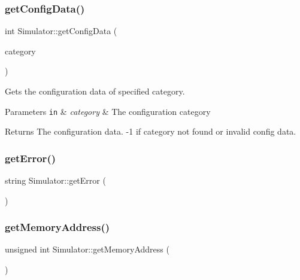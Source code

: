 \subsubsection{\texorpdfstring{get\+Config\+Data()}{getConfigData()}}
{\footnotesize\ttfamily int Simulator\+::get\+Config\+Data (\begin{DoxyParamCaption}\item[{\hyperlink{_sim_data_structs_8h_a32f23b552ade08d96d49cc3061a27165}{Config\+Category}}]{category }\end{DoxyParamCaption})\hspace{0.3cm}{\ttfamily [private]}}



Gets the configuration data of specified category. 


\begin{DoxyParams}[1]{Parameters}
\mbox{\tt in}  & {\em category} & The configuration category\\
\hline
\end{DoxyParams}
\begin{DoxyReturn}{Returns}
The configuration data. -\/1 if category not found or invalid config data. 
\end{DoxyReturn}
\hypertarget{class_simulator_a18d712f028a9b09f131b48a0ca79c056}{}\label{class_simulator_a18d712f028a9b09f131b48a0ca79c056} 
\subsubsection{\texorpdfstring{get\+Error()}{getError()}}
{\footnotesize\ttfamily string Simulator\+::get\+Error (\begin{DoxyParamCaption}{ }\end{DoxyParamCaption})\hspace{0.3cm}{\ttfamily [inline]}}

\hypertarget{class_simulator_ab73a18e336c76ea75edb7750d933b867}{}\label{class_simulator_ab73a18e336c76ea75edb7750d933b867} 
\subsubsection{\texorpdfstring{get\+Memory\+Address()}{getMemoryAddress()}}
{\footnotesize\ttfamily unsigned int Simulator\+::get\+Memory\+Address (\begin{DoxyParamCaption}{ }\end{DoxyParamCaption})}



